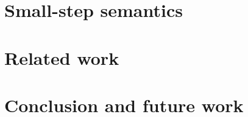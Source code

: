 \documentclass[preprint]{sigplanconf}
\newcommand{\many}{\overline}
\newcommand{\judgeword}[1]{~\mathbf{#1}~}
\newcommand{\sigentails}[1]{\mathbin{[{\text{\scriptsize ${#1}$}}]\!\text{-\!-}}\,}
\newcommand{\is}[4]  {#1 \sigentails{#2} {#3} \judgeword{is} {#4}}
\newcommand{\has}[4] {#1 \sigentails{#2} {#3} \judgeword{has} {#4}}
\newcommand{\does}[4]{#1 \sigentails{#2} {#3} \judgeword{has} {#4}}
\newcommand{\isgs}{\is{\Gamma}{\sigs}}
\newcommand{\hasgs}{\has{\Gamma}{\sigs}}
\newcommand{\doesgs}{\does{\Gamma}{\sigs}}
\newcommand{\sig}{S}
\newcommand{\sigs}{\Sigma}
\newcommand{\X}{X}  %
\newcommand{\U}{U}
\newcommand{\V}{V}
\newcommand{\Us}{\many{\U}}
\newcommand{\Vs}{\many{\V}}
\newcommand{\C}{C}
\newcommand{\tm}{t}
\newcommand{\tu}{u}
\newcommand{\tms}{\many{\tm}}
\newcommand{\h}{h}
\newcommand{\op}{\mathit{op}}
\newcommand{\effbox}[1]{[#1]}
\newcommand{\ret}[2]{\effbox{#1}{#2}}
\newcommand{\handleSymbol}{\mathbin{?}}
\newcommand{\handle}[2]{{#1} \handleSymbol {#2}}
\newcommand{\thunk}[1]{\{{#1}\}}
\newcommand{\force}[1]{{#1}!}
\newcommand{\con}{K}
\newcommand{\D}{D}
\begin{document}
\section{Small-step semantics}

\section{Related work}

\section{Conclusion and future work}










\end{document}
